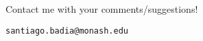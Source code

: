 \begin{frame}

{\huge \color{red}{Thanks!}}

{Contact me with your comments/suggestions!

\texttt{santiago.badia@monash.edu}}

\end{frame}










\newcommand{\grad}{\boldsymbol{\nabla}}
\def\u{\boldsymbol{u}}
\def\v{\boldsymbol{v}}
\def\H{\boldsymbol{H}}
\def\b{\boldsymbol{b}}

